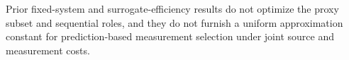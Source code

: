 Prior fixed-system and surrogate-efficiency results do not optimize the proxy subset and sequential roles, and they do not furnish a uniform approximation constant for prediction-based measurement selection under joint source and measurement costs.